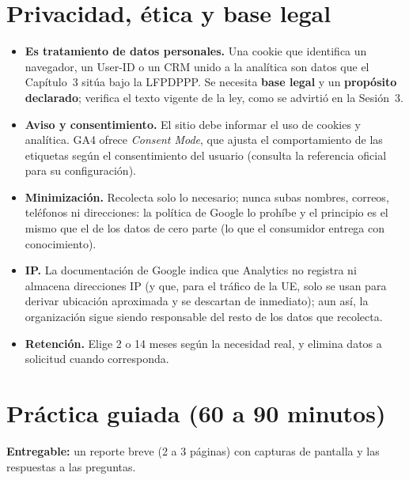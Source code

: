 \documentclass[11pt,letterpaper]{article}
\begin{document}
\section{Privacidad, ética y base legal}

\begin{itemize}[nosep]
  \item \textbf{Es tratamiento de datos personales.} Una cookie que identifica un navegador, un User-ID o un CRM unido a la analítica son datos que el Capítulo~3 sitúa bajo la LFPDPPP. Se necesita
        \textbf{base legal} y un \textbf{propósito declarado}; verifica el texto vigente de la ley, como se advirtió en la Sesión~3.
  \item \textbf{Aviso y consentimiento.} El sitio debe informar el uso de cookies y analítica. GA4 ofrece \emph{Consent Mode}, que ajusta el comportamiento de las etiquetas según el consentimiento
        del usuario (consulta la referencia oficial para su configuración).
  \item \textbf{Minimización.} Recolecta solo lo necesario; nunca subas nombres, correos, teléfonos ni direcciones: la política de Google lo prohíbe y el principio es el mismo que el de
        los datos de cero parte (lo que el consumidor entrega con conocimiento).
  \item \textbf{IP.} La documentación de Google indica que Analytics no registra ni almacena direcciones IP (y que, para el tráfico de la UE, solo se usan para derivar ubicación aproximada y se descartan de inmediato); aun así, la organización sigue siendo responsable del resto de los datos que recolecta.
  \item \textbf{Retención.} Elige 2 o 14 meses según la necesidad real, y elimina datos a solicitud cuando corresponda.
\end{itemize}

\section{Práctica guiada (60 a 90 minutos)}

\textbf{Entregable:} un reporte breve (2 a 3 páginas) con capturas de pantalla y las respuestas a las preguntas.
\end{document}

